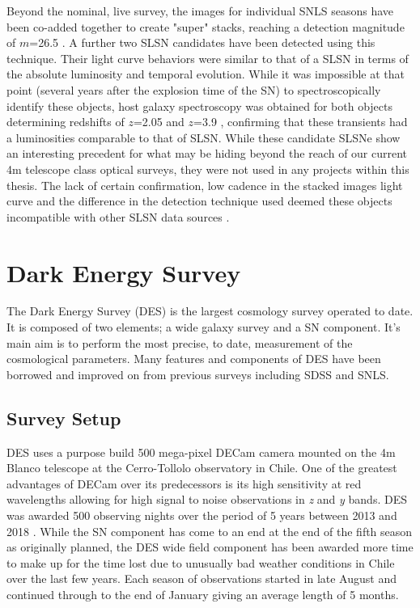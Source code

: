 Beyond the nominal, live survey, the images for individual SNLS seasons have been co-added together to create "super" stacks, reaching a detection magnitude of $m$=26.5 \citep{Cooke2012}. A further two SLSN candidates have been detected using this technique. Their light curve behaviors were similar to that of a SLSN in terms of the absolute luminosity and temporal evolution. While it was impossible at that point (several years after the explosion time of the SN) to spectroscopically identify these objects, host galaxy spectroscopy was obtained for both objects determining redshifts of $z$=2.05 and $z$=3.9 \citep{Cooke2012}, confirming that these transients had a luminosities comparable to that of SLSN. While these candidate SLSNe show an interesting precedent for what may be hiding beyond the reach of our current 4m telescope class optical surveys, they were not used in any projects within this thesis. The lack of certain confirmation, low cadence in the stacked images light curve and the difference in the detection technique used deemed these objects incompatible with other SLSN data sources \citep{Prajs2016}.

\section{Dark Energy Survey}
The Dark Energy Survey (DES) is the largest cosmology survey operated to date. It is composed of two elements; a wide galaxy survey and a SN component. It's main aim is to perform the most precise, to date, measurement of the cosmological parameters. Many features and components of DES have been borrowed and improved on from previous surveys including SDSS and SNLS.

\subsection{Survey Setup}
DES uses a purpose build 500 mega-pixel DECam camera \citep{Honscheid2008,Flaugher2015} mounted on the 4m Blanco telescope at the Cerro-Tollolo observatory in Chile. One of the greatest advantages of DECam over its predecessors is its high sensitivity at red wavelengths allowing for high signal to noise observations in \textit{z} and \textit{y} bands. DES was awarded 500 observing nights over the period of 5 years between 2013 and 2018 \citep{DES2016}. While the SN component has come to an end at the end of the fifth season as originally planned, the DES wide field component has been awarded more time to make up for the time lost due to unusually bad weather conditions in Chile over the last few years. Each season of observations started in late August and continued through to the end of January giving an average length of 5 months.


